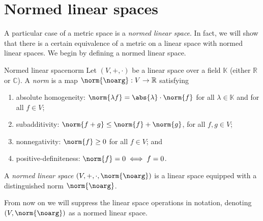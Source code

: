 \chapter{Normed linear spaces}
A particular case of a metric space is a \emph{normed linear space}. In fact, we will show that there is a certain equivalence of a metric on a linear space with normed linear spaces. We begin by defining a normed linear space.
\begin{definition}{Normed linear space}{norm}
    Let \((V, +, \cdot)\) be a linear space over a field \(\mathbb{K}\) (either \(\mathbb{R}\) or \(\mathbb{C}\)). A \emph{norm} is a map \(\norm{\noarg} : V \to \mathbb{R}\) satisfying
    \begin{enumerate}[label=(\alph*)]
        \item absolute homogeneity: \(\norm{\lambda f} = \abs{\lambda}\cdot \norm{f}\) for all \(\lambda \in \mathbb{K}\) and for all \(f \in V\);
        \item subadditivity: \(\norm{f + g} \leq \norm{f} + \norm{g}\), for all \(f, g \in V\);
        \item nonnegativity: \(\norm{f} \geq 0\) for all \(f \in V\); and
        \item positive-definiteness: \(\norm{f} = 0 \iff f = 0\).
    \end{enumerate}
    A \emph{normed linear space} \((V,+, \cdot, \norm{\noarg})\) is a linear space equipped with a distinguished norm \(\norm{\noarg}\).
\end{definition}
\begin{remark}
    From now on we will suppress the linear space operations in notation, denoting \((V, \norm{\noarg})\) as a normed linear space.
\end{remark}

